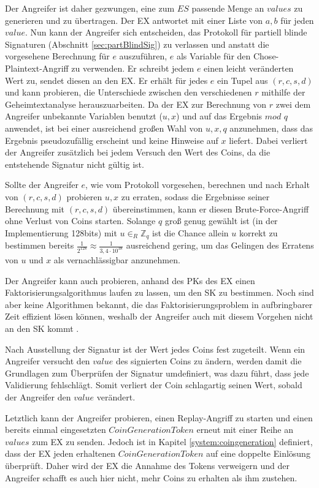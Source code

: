 \documentclass[
	fontsize=11pt,
	headings=small,
	parskip=half,           %
	bibliography=totoc,
	numbers=noenddot,       %
	open=any,               %
]{scrreprt}
\begin{document}
Der Angreifer ist daher gezwungen, eine zum $ES$ passende Menge an $values$ zu generieren und zu übertragen. Der EX antwortet mit einer Liste von $a,b$ für jeden $value$. Nun kann der Angreifer sich entscheiden, das Protokoll für partiell blinde Signaturen (Abschnitt \ref{sec:partBlindSig}) zu verlassen und anstatt die vorgesehene Berechnung für $e$ auszuführen, $e$ als Variable für den Chose-Plaintext-Angriff zu verwenden. Er schreibt jedem $e$ einen leicht veränderten Wert zu, sendet diesen an den EX. Er erhält für jedes $e$ ein Tupel aus $(r,c,s,d)$ und kann probieren, die Unterschiede zwischen den verschiedenen $r$ mithilfe der Geheimtextanalyse herauszuarbeiten. Da der EX zur Berechnung von $r$ zwei dem Angreifer unbekannte Variablen benutzt ($u,x$) und auf das Ergebnis $mod$ $q$ anwendet, ist bei einer ausreichend großen Wahl von $u,x,q$ anzunehmen, dass das Ergebnis pseudozufällig erscheint und keine Hinweise auf $x$ liefert. Dabei verliert der Angreifer zusätzlich bei jedem Versuch den Wert des Coins, da die entstehende Signatur nicht gültig ist.

Sollte der Angreifer $e$, wie vom Protokoll vorgesehen, berechnen und nach Erhalt von $(r,c,s,d)$ probieren $u,x$ zu erraten, sodass die Ergebnisse seiner Berechnung mit $(r,c,s,d)$ übereinstimmen, kann er diesen Brute-Force-Angriff ohne Verlust von Coins starten. Solange $q$ groß genug gewählt ist (in der Implementierung 128bits) mit $u{\in}_{R} {\mathbb{Z}}_{q}$ ist die Chance allein $u$ korrekt zu bestimmen bereits $\frac{1}{2^{128}} \approx \frac{1}{3,4\cdot10^{38}}$ ausreichend gering, um das Gelingen des Erratens von $u$ und $x$ als vernachlässigbar anzunehmen.

Der Angreifer kann auch probieren, anhand des PKs des EX einen Faktorisierungsalgorithmus laufen zu lassen, um den SK zu bestimmen. Noch sind aber keine Algorithmen bekannt, die das Faktorisierungsproblem in aufbringbarer Zeit effizient lösen können, weshalb der Angreifer auch mit diesem Vorgehen nicht an den SK kommt \cite{montgomery1994survey}.

Nach Ausstellung der Signatur ist der Wert jedes Coins fest zugeteilt. Wenn ein Angreifer versucht den $value$ des signierten Coins zu ändern, werden damit die Grundlagen zum Überprüfen der Signatur umdefiniert, was dazu führt, dass jede Validierung fehlschlägt. Somit verliert der Coin schlagartig seinen Wert, sobald der Angreifer den $value$ verändert.

Letztlich kann der Angreifer probieren, einen Replay-Angriff zu starten und einen bereits einmal eingesetzten $CoinGenerationToken$ erneut mit einer Reihe an $values$ zum EX zu senden. Jedoch ist in Kapitel \ref{system:coingeneration} definiert, dass der EX jeden erhaltenen $CoinGenerationToken$ auf eine doppelte Einlösung überprüft. Daher wird der EX die Annahme des Tokens verweigern und der Angreifer schafft es auch hier nicht, mehr Coins zu erhalten als ihm zustehen.
\end{document}
